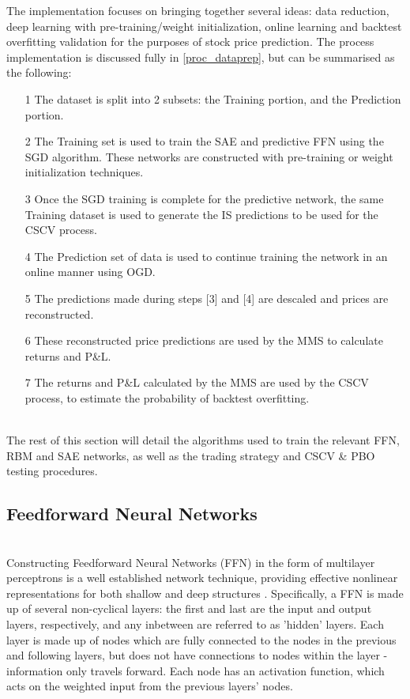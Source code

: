 \documentclass[a4paper,11pt,oneside]{article}
\theoremstyle{plain}
\theoremstyle{definition}
\begin{document}
	
	The implementation focuses on bringing together several ideas: data reduction, deep learning with pre-training/weight initialization, online learning and backtest overfitting validation for the purposes of stock price prediction. The process implementation is discussed fully in \ref{proc_dataprep}, but can be summarised as the following:
	
	\begin{itemize}
		\item [1] The dataset is split into 2 subsets: the Training portion, and the Prediction portion.
		\item [2] The Training set is used to train the SAE and predictive FFN using the SGD algorithm. These networks are constructed with pre-training or weight initialization techniques.
		\item [3] Once the SGD training is complete for the predictive network, the same Training dataset is used to generate the IS predictions to be used for the CSCV process.
		\item [4] The Prediction set of data is used to continue training the network in an online manner using OGD.
		\item [5] The predictions made during steps [3] and [4] are descaled and prices are reconstructed.
		\item [6] These reconstructed price predictions are used by the MMS to calculate returns and P\&L.
		\item [7] The returns and P\&L calculated by the MMS are used by the CSCV process, to estimate the probability of backtest overfitting.
	\end{itemize}
	~\\
	The rest of this section will detail the algorithms used to train the relevant FFN, RBM and SAE networks, as well as the trading strategy and CSCV \& PBO testing procedures.
	
	\subsection{Feedforward Neural Networks}\label{imp_ffn}
	~\\
	Constructing Feedforward Neural Networks (FFN) in the form of multilayer perceptrons is a well established network technique, providing effective nonlinear representations for both shallow and deep structures \cite{Schmidhuber}. Specifically, a FFN is made up of several non-cyclical layers: the first and last are the input and output layers, respectively, and any inbetween are referred to as 'hidden' layers. Each layer is made up of nodes which are fully connected to the nodes in the previous and following layers, but does not have connections to nodes within the layer - information only travels forward. Each 
	node has an activation function, which acts on the weighted input from the previous layers' nodes.
	
\end{document}
